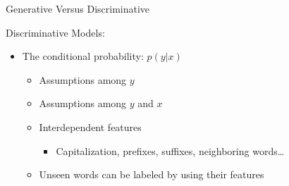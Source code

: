 \documentclass[presentation,bigger]{beamer}
\begin{document}
\begin{frame}[label={sec:orgheadline5}]{Generative Versus Discriminative}
\begin{block}{Discriminative Models:}
\begin{itemize}
\item The conditional probability: \(p(y|x)\)
\begin{itemize}
\item Assumptions among \(y\)
\item Assumptions among \(y\) and \(x\)
\item Interdependent features
\begin{itemize}
\item Capitalization, prefixes, suffixes, neighboring words\ldots{}
\end{itemize}
\item Unseen words can be labeled by using their features
\end{itemize}
\end{itemize}
\end{block}
\end{frame}
\end{document}
